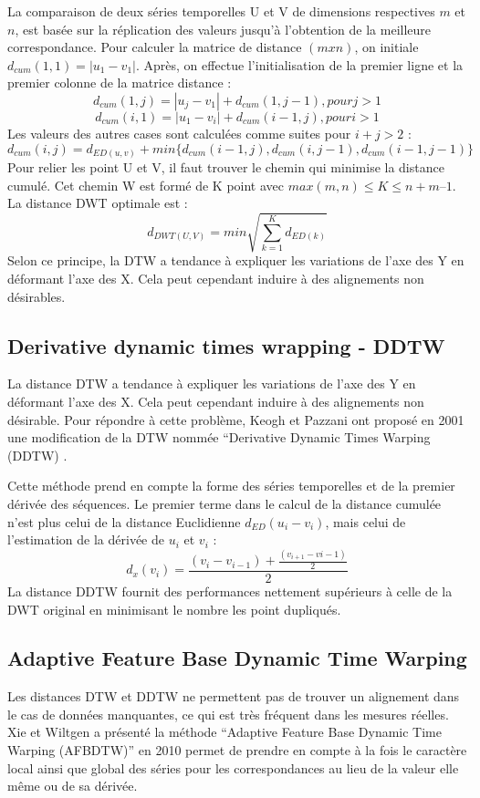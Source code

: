 La comparaison de deux séries temporelles U et V de dimensions respectives $m$ et $n$, est basée sur la réplication des valeurs jusqu’à l’obtention de la meilleure correspondance. Pour calculer la matrice de distance $(m x n)$, on initiale $d_{cum}(1,1) = | u_1 - v_1 |$. Après, on effectue l'initialisation de la premier ligne et la premier colonne de la matrice distance : 
$$d_{cum}(1, j) = | u_j - v_1 | + d_{cum}(1, j - 1) , pour j > 1$$ 
$$d_{cum}(i, 1) = | u_1 - v_i | + d_{cum}(i - 1, j),  pour  i > 1$$ 
Les valeurs des autres cases sont calculées comme suites pour $i + j > 2$ : 
$$d_{cum}(i, j) = d_{ED(u, v)} + min \{  d_{cum}(i - 1, j), d_{cum}(i, j - 1), d_{cum}(i - 1, j - 1) \} $$
Pour relier les point U et V, il faut trouver le chemin qui minimise la distance cumulé. Cet chemin W est formé de K point avec $max(m,n) \leq K \leq n + m – 1$. La distance DWT optimale est :
$$d_{DWT(U, V)} = min\sqrt{\sum^{K}_{k = 1} {d_{ED(k)}}} $$
Selon ce principe, la DTW a tendance à expliquer les variations de l’axe des Y en déformant l’axe des X. Cela peut cependant induire à des alignements non désirables.
\subsection{Derivative dynamic times wrapping - DDTW}
La distance DTW a tendance à expliquer les variations de l’axe des Y en déformant l’axe des X. Cela peut cependant induire à des alignements non désirable. Pour répondre à cette problème, Keogh et Pazzani ont proposé en 2001 une modification de la DTW nommée “Derivative Dynamic Times Warping (DDTW) \cite{keogh2001}. 

Cette méthode prend en compte la forme des séries temporelles et de la premier dérivée des séquences. Le premier terme dans le calcul de la distance cumulée n’est plus celui de la distance Euclidienne $d_{ED} (u_i  - v_i)$, mais celui de l’estimation de la dérivée de $u_i$ et $v_i$ :
$$d_x(v_i) = \frac{(v_i - v_{i - 1}) + \frac{(v_{i + 1} - v{i - 1} )} {2}    } {2} $$
La distance DDTW fournit des performances nettement supérieurs à celle de la DWT original en minimisant le nombre les point dupliqués.
\subsection{Adaptive Feature Base Dynamic Time Warping }
Les distances DTW et DDTW ne permettent pas de trouver un alignement dans le cas de données manquantes, ce qui est très fréquent dans les mesures réelles. Xie et Wiltgen a présenté la méthode “Adaptive Feature Base Dynamic Time Warping (AFBDTW)” en 2010 \cite{xie2010} permet de prendre en compte à la fois le caractère local ainsi que global des séries pour les correspondances au lieu de la valeur elle même ou de sa dérivée.

